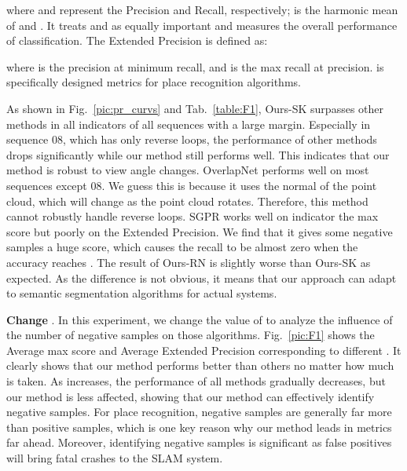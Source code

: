 \documentclass[letterpaper, 10 pt, conference]{ieeeconf}
\begin{document}
where  and  represent the Precision and Recall, respectively;  is the harmonic mean of  and . It treats  and  as equally important and measures the overall performance of classification. The Extended Precision is defined as:

where  is the precision at minimum recall, and  is the max recall at  precision.  is specifically designed metrics for place recognition algorithms. 

As shown in Fig.~\ref{pic:pr_curvs} and Tab.~\ref{table:F1}, Ours-SK surpasses other methods in all indicators of all sequences with a large margin. Especially in sequence 08, which has only reverse loops, the performance of other methods drops significantly while our method still performs well. This indicates that our method is robust to view angle changes. OverlapNet performs well on most sequences except 08. We guess this is because it uses the normal of the point cloud, which will change as the point cloud rotates. Therefore, this method cannot robustly handle reverse loops. SGPR works well on indicator the  max score but poorly on the Extended Precision. We find that it gives some negative samples a huge score, which causes the recall to be almost zero when the accuracy reaches . The result of Ours-RN is slightly worse than Ours-SK as expected. As the difference is not obvious, it means that our approach can adapt to semantic segmentation algorithms for actual systems.

\textbf{Change }. In this experiment, we change the value of  to analyze the influence of the number of negative samples on those algorithms. Fig.~\ref{pic:F1} shows the Average  max score and Average Extended Precision corresponding to different . It clearly shows that our method performs better than others no matter how much  is taken. As  increases, the performance of all methods gradually decreases, but our method is less affected, showing that our method can effectively identify negative samples. For place recognition, negative samples are generally far more than positive samples, which is one key reason why our method leads in metrics far ahead. Moreover, identifying negative samples is significant as false positives will bring fatal crashes to the SLAM system.
\end{document}
